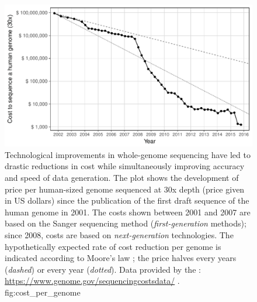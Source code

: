 

\begin{figure}[!htb]
\includegraphics[width=\textwidth]{./img/ch1/cost_per_genome}
{Technological improvements in whole-genome sequencing have led to drastic reductions in cost while simultaneously improving accuracy and speed of data generation.
The plot shows the development of price per human-sized genome sequenced at 30x depth (price given in US dollars) since the publication of the first draft sequence of the human genome in 2001.
The costs shown between 2001 and 2007 are based on the Sanger sequencing method (\emph{first-generation} methods); since 2008, costs are based on \emph{next-generation} technologies.
The hypothetically expected rate of cost reduction per genome is indicated according to Moore's law \citep{moore1965}; the price halves every  years (\emph{dashed}) or every year (\emph{dotted}).
Data provided by the : \url{https://www.genome.gov/sequencingcostsdata/} .}
{fig:cost_per_genome}
\end{figure}
